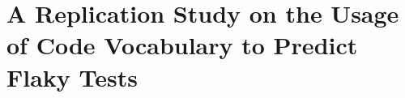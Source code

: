 \chapter{A Replication Study on the Usage of Code Vocabulary to Predict Flaky Tests}
\label{chap:replication}

\chapterPage{
}







